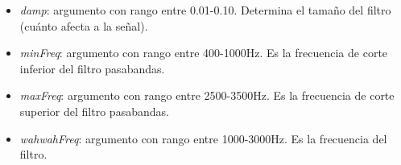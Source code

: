 \begin{itemize}
 \item \textit{damp}: argumento con rango entre 0.01-0.10. Determina el tamaño del filtro (cuánto afecta a la señal).
 \item \textit{minFreq}: argumento con rango entre 400-1000Hz. Es la frecuencia de corte inferior del filtro pasabandas.
 \item \textit{maxFreq}: argumento con rango entre 2500-3500Hz. Es la frecuencia de corte superior del filtro pasabandas.
 \item \textit{wahwahFreq}: argumento con rango entre 1000-3000Hz. Es la frecuencia del filtro.
\end{itemize}
 
 
